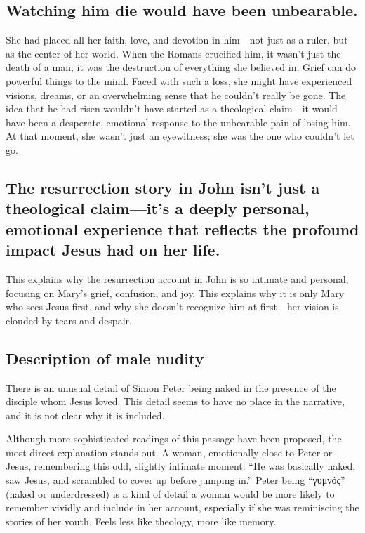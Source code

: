 \subsection{Watching him die would have been unbearable.}\label{subsec:watching-him-die-would-have-been-unbearable.}

She had placed all her faith, love, and devotion in him---not just as a ruler, but as the center of her world.
When the Romans crucified him, it wasn't just the death of a man; it was the destruction of everything she believed in.
Grief can do powerful things to the mind.
Faced with such a loss, she might have experienced visions, dreams, or an overwhelming sense that he couldn't really be gone.
The idea that he had risen wouldn't have started as a theological claim---it would have been a desperate, emotional response to the unbearable pain of losing him.
At that moment, she wasn't just an eyewitness; she was the one who couldn't let go.

\subsection{The resurrection story in John isn't just a theological claim---it's a deeply personal, emotional experience that reflects the profound impact Jesus had on her life.}\label{subsec:the-resurrection-story-in-john-isnt-just-a-theological-claimits-a-deeply-personal-emotional-experience-that-reflects-the-profound-impact-jesus-had-on-her-life.}

This explains why the resurrection account in John is so intimate and personal, focusing on Mary's grief, confusion, and joy.
This explains why it is only Mary who sees Jesus first, and why she doesn't recognize him at first---her vision is clouded by tears and despair.

\subsection{Description of male nudity}\label{subsec:description-of-male-nudity}

There is an unusual detail of Simon Peter being naked in the presence of the disciple whom Jesus loved.
This detail seems to have no place in the narrative, and it is not clear why it is included.

Although more sophisticated readings of this passage have been proposed, the most direct explanation stands out.
A woman, emotionally close to Peter or Jesus, remembering this odd, slightly intimate moment: ``He was basically naked, saw Jesus, and scrambled to cover up before jumping in.'' Peter being ``γυμνός'' (naked or underdressed) is a kind of detail a woman would be more likely to remember vividly and include in her account, especially if she was reminiscing the stories of her youth.
Feels less like theology, more like memory.

